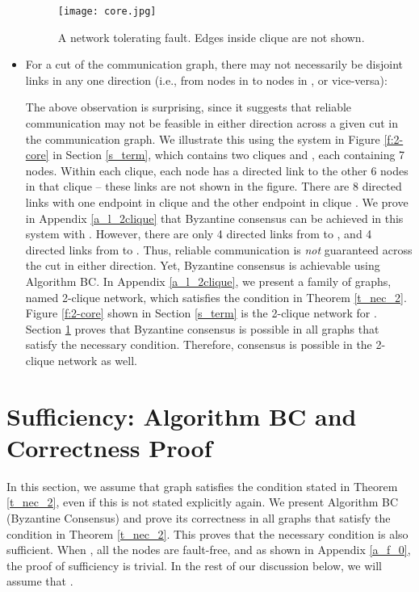 \documentclass[letterpaper, 11pt]{article}
\begin{document}
\begin{itemize}
\begin{figure}[hbtp!]
\texttt{[image: core.jpg]}
\vspace*{-30pt}
\caption{A network tolerating  fault. Edges inside clique  are not shown.}
\label{f:core}
\end{figure}

\item For a cut  of the communication graph, there may not necessarily be  disjoint links 
in any one direction (i.e., from nodes in  to nodes in , or vice-versa):

The above observation is surprising, since it suggests that reliable communication may not be
feasible in either direction across a given cut in the communication graph.
We illustrate this using the system in
Figure \ref{f:2-core} in Section \ref{s_term}, which contains 
two cliques  and , each containing 7 nodes.
Within each clique, each node has a directed link to the other 6 nodes
in that clique -- these links
are not shown in the figure.
There are 8 directed links with one endpoint in clique  and the other endpoint in clique .
We prove in Appendix \ref{a_l_2clique} that Byzantine consensus can be
achieved in this system with .
However, there are only 4 directed links from  to ,
and 4 directed links from  to . Thus, reliable communication is
{\em not} guaranteed across the cut  in either direction.
Yet, Byzantine consensus is achievable using Algorithm BC.  
In Appendix \ref{a_l_2clique}, we present a family of graphs, named 2-clique network, which satisfies the
condition in Theorem \ref{t_nec_2}. Figure \ref{f:2-core} shown in Section \ref{s_term} is the 2-clique network for .
Section \ref{s_sufficiency} proves that Byzantine consensus is possible in all graphs
that satisfy the necessary condition. Therefore, consensus is possible in the 2-clique
network as well. 
\end{itemize}










\section{Sufficiency: Algorithm BC and Correctness Proof}
\label{s_sufficiency}

In this section, we assume that graph  satisfies the condition stated in Theorem \ref{t_nec_2}, even if this is not stated explicitly again. We present Algorithm BC (Byzantine Consensus) and prove its correctness in all graphs that satisfy the condition in Theorem \ref{t_nec_2}. This proves that the necessary condition is also sufficient. 
When , all the nodes are fault-free,
and as shown in Appendix \ref{a_f_0}, 
the proof of sufficiency is trivial.
In the rest of our discussion below, we will assume that . 
\end{document}
